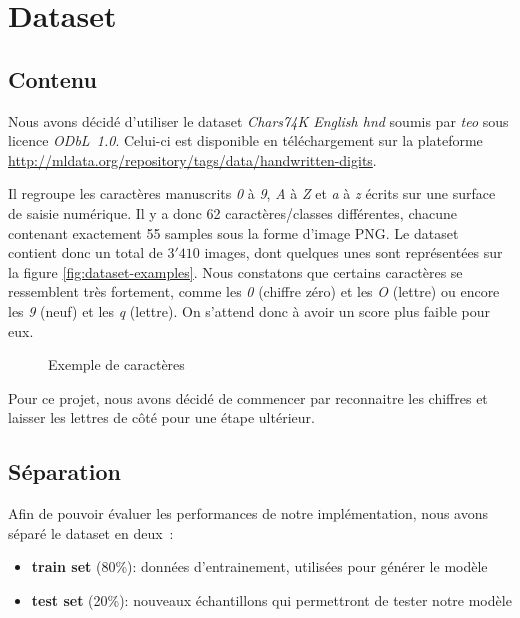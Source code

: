 
\chapter{Dataset}

\section{Contenu}

Nous avons décidé d'utiliser le dataset \emph{Chars74K English hnd} soumis par \emph{teo} sous licence \emph{ODbL~1.0}. Celui-ci est disponible en téléchargement sur la plateforme \url{http://mldata.org/repository/tags/data/handwritten-digits}.

Il regroupe les caractères manuscrits \emph{0} à \emph{9}, \emph{A} à \emph{Z} et \emph{a} à \emph{z} écrits sur une surface de saisie numérique. Il y a donc 62 caractères/classes différentes, chacune contenant exactement 55 samples sous la forme d'image PNG. Le dataset contient donc un total de $3'410$ images, dont quelques unes sont représentées sur la figure \vref{fig:dataset-examples}. Nous constatons que certains caractères se ressemblent très fortement, comme les \emph{0} (chiffre zéro) et les \emph{O} (lettre) ou encore les \emph{9} (neuf) et les \emph{q} (lettre). On s'attend donc à avoir un score plus faible pour eux.

\begin{figure}[h]
\caption{Exemple de caractères}
\label{fig:dataset-examples}
\end{figure}

Pour ce projet, nous avons décidé de commencer par reconnaitre les chiffres et laisser les lettres de côté pour une étape ultérieur.


\section{Séparation}

Afin de pouvoir évaluer les performances de notre implémentation, nous avons séparé le dataset en deux~:
\begin{itemize}
\item \textbf{train set} (80\%): données d'entrainement, utilisées pour générer le modèle
\item \textbf{test set} (20\%): nouveaux échantillons qui permettront de tester notre modèle
\end{itemize} 

